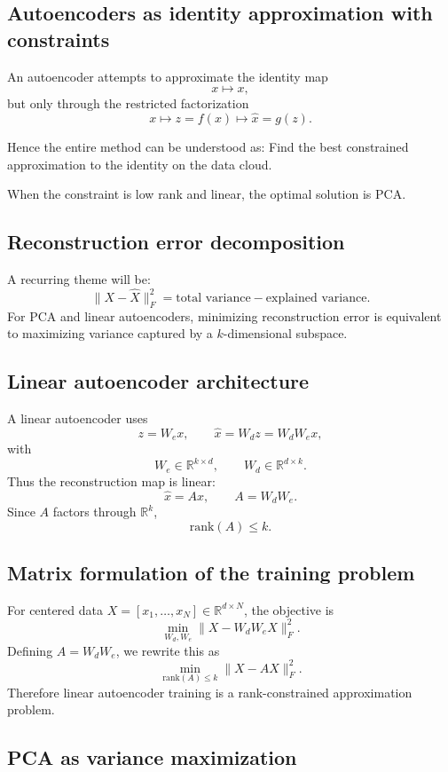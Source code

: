 \documentclass[%
oneside,                 %
final,                   %
10pt]{article}
\begin{document}
\subsection{Autoencoders as identity approximation with constraints}

An autoencoder attempts to approximate the identity map
\[
x \mapsto x,
\]
but only through the restricted factorization
\[
x \mapsto z=f(x)\mapsto \hat x=g(z).
\]
\begin{block}{Hence the entire method can be understood as: }
Find the best constrained approximation to the identity on the data cloud.
\end{block}
When the constraint is low rank and linear, the optimal solution is PCA.

\subsection{Reconstruction error decomposition}

A recurring theme will be:
\[
\|X-\hat X\|_F^2 = \text{total variance} - \text{explained variance}.
\]
For PCA and linear autoencoders, minimizing reconstruction error is equivalent to maximizing variance captured by a \(k\)-dimensional subspace.

\subsection{Linear autoencoder architecture}

A linear autoencoder uses
\[
z = W_e x,\qquad \hat x = W_d z = W_d W_e x,
\]
with
\[
W_e\in\mathbb{R}^{k\times d},\qquad W_d\in\mathbb{R}^{d\times k}.
\]
Thus the reconstruction map is linear:
\[
\hat x = A x,\qquad A=W_dW_e.
\]
Since \(A\) factors through \(\mathbb{R}^k\),
\[
\mathrm{rank}(A)\le k.
\]

\subsection{Matrix formulation of the training problem}

For centered data \(X=[x_1,\dots,x_N]\in\mathbb{R}^{d\times N}\), the objective is
\[
\min_{W_d,W_e}\|X-W_dW_eX\|_F^2.
\]
Defining \(A=W_dW_e\), we rewrite this as
\[
\min_{\mathrm{rank}(A)\le k}\|X-AX\|_F^2.
\]
Therefore linear autoencoder training is a rank-constrained approximation problem.

\subsection{PCA as variance maximization}
\end{document}
